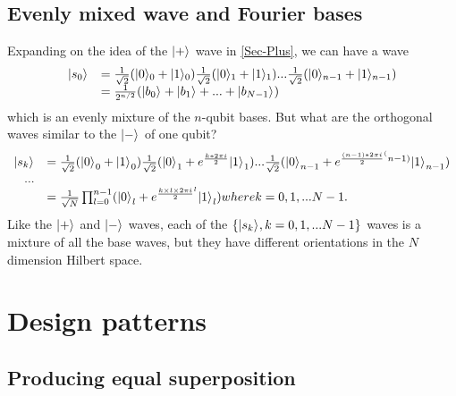 \documentclass[oneside, letter, 12pt]{book}
\begin{document}
\subsection{Evenly mixed wave and Fourier bases}
Expanding on the idea of the $\keta{+}$ wave in \ref{Sec-Plus}, we can have a wave
\begin{equation}
\begin{array}{rl}
    \keta{s_0} &= \frac 1 {\sqrt{2}} (\keta[0]{0}+\keta[0]{1}) \frac 1 {\sqrt{2}} (\keta[1]{0}+\keta[1]{1})
    ... \frac 1 {\sqrt{2}} (\keta[n-1]{0}+\keta[n-1]{1}) \\
    &= \frac 1 {2^{n/2}} (\keta{b_0}+\keta{b_1}+...+\keta{b_{N-1}})
 \end{array}
\end{equation}
which is an evenly mixture of the $n$-qubit bases. But what are the orthogonal waves similar to the $\keta{-}$ of one qubit?
\begin{equation}
\begin{array}{rl}
\keta{s_k} &= \frac 1 {\sqrt{2}} ({\keta{0}}_0+{\keta{1}}_0)
    \frac 1 {\sqrt{2}} ({\keta{0}}_1+e^{\frac {k*2 \pi i} 2}{\keta{1}}_1)
    ...  \frac 1 {\sqrt{2}} ({\keta{0}}_{n-1}+e^{\frac {(n-1)*2\pi i} 2^(n-1)}{\keta{1}}_{n-1}) \\
    ... \\
    &= \frac 1 {\sqrt{N}} \prod^{n-1}_{l=0} ({\keta{0}}_l+e^{\frac {k\times l \times 2\pi i} 2^l}{\keta{1}}_l) where k=0, 1, ...N-1.
\end{array}
\end{equation}
Like the $\keta{+}$ and $\keta{-}$ waves, each of the $\{\keta{s_k}, k=0, 1, ... N-1\}$ waves is a mixture of all the base waves, but they have different orientations in the $N$ dimension Hilbert space.

\section{Design patterns}

\subsection{Producing equal superposition}
\end{document}
